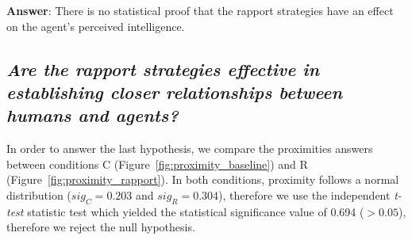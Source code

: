 \textbf{Answer}: There is no statistical proof that the rapport strategies have an effect on the agent's perceived intelligence.
 
\subsection*{\textit{Are the rapport strategies effective in establishing closer relationships between humans and agents?}}

In order to answer the last hypothesis, we compare the proximities answers between conditions C (Figure~\ref{fig:proximity_baseline}) and R (Figure~\ref{fig:proximity_rapport}). In both conditions, proximity follows a normal distribution ($sig_C=0.203$ and $sig_R=0.304$), therefore we use the independent \textit{t-test} statistic test which yielded the statistical significance value of 0.694 ($>0.05$), therefore we reject the null hypothesis.

